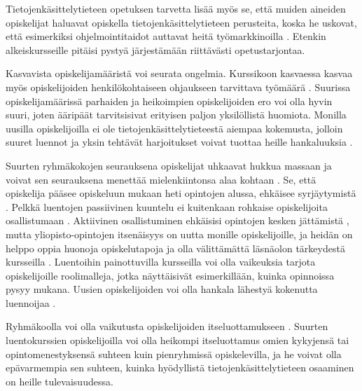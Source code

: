 \documentclass[finnish]{tktltiki2}
\theoremstyle{definition}
\theoremstyle{remark}
\begin{document}
Tietojenkäsittelytieteen opetuksen tarvetta lisää myös se, että muiden aineiden opiskelijat haluavat opiskella tietojenkäsittelytieteen perusteita, koska he uskovat, että esimerkiksi ohjelmointitaidot auttavat heitä työmarkkinoilla \cite{Roberts11}. Etenkin alkeiskursseille pitäisi pystyä järjestämään riittävästi opetustarjontaa. \par

Kasvavista opiskelijamääristä voi seurata ongelmia. Kurssikoon kasvaessa kasvaa myös opiskelijoiden henkilökohtaiseen ohjaukseen tarvittava työmäärä \cite{Kay98}. Suurissa opiskelijamäärissä parhaiden ja heikoimpien opiskelijoiden ero voi olla hyvin suuri, joten ääripäät tarvitsisivat erityisen paljon yksilöllistä huomiota. Monilla uusilla opiskelijoilla ei ole tietojenkäsittelytieteestä aiempaa kokemusta, jolloin suuret luennot ja yksin tehtävät harjoitukset voivat tuottaa heille hankaluuksia \cite{Murphy11}. \par

Suurten ryhmäkokojen seurauksena opiskelijat uhkaavat hukkua massaan ja voivat sen seurauksena menettää mielenkiintonsa alaa kohtaan \cite{Kay98}. Se, että opiskelija pääsee opiskeluun mukaan heti opintojen alussa, ehkäisee syrjäytymistä \cite{Settle12}. Pelkkä luentojen passiivinen kuuntelu ei kuitenkaan rohkaise opiskelijoita osallistumaan \cite{Kopp00}. Aktiivinen osallistuminen ehkäisisi opintojen kesken jättämistä \cite{Boyer07}, mutta yliopisto-opintojen itsenäisyys on uutta monille opiskelijoille, ja heidän on helppo oppia huonoja opiskelutapoja ja olla välittämättä läsnäolon tärkeydestä kursseilla \cite{Kopp00}. Luentoihin painottuvilla kursseilla voi olla vaikeuksia tarjota opiskelijoille roolimalleja, jotka näyttäisivät esimerkillään, kuinka opinnoissa pysyy mukana. Uusien opiskelijoiden voi olla hankala lähestyä kokenutta luennoijaa \cite{Kopp00}. \par

Ryhmäkoolla voi olla vaikutusta opiskelijoiden itseluottamukseen \cite{Boyer07}. Suurten luentokurssien opiskelijoilla voi olla heikompi itseluottamus omien kykyjensä tai opintomenestyksensä suhteen kuin pienryhmissä opiskelevilla, ja he voivat olla epävarmempia sen suhteen, kuinka hyödyllistä tietojenkäsittelytieteen osaaminen on heille tulevaisuudessa. \par
\end{document}
